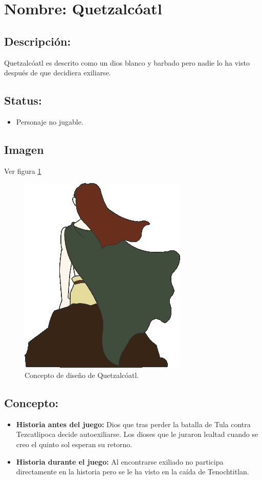 \section{Nombre: Quetzalcóatl}  \label{per:quetzalcoatl}
\subsection{Descripción:}
Quetzalcóatl es descrito como un dios blanco y barbado pero nadie lo ha visto después de que decidiera exiliarse.
\subsection{Status:}
\begin{itemize}
		\item Personaje no jugable.
	\end{itemize}
\subsection{Imagen}
Ver figura \ref{fig:quetDiseno}
	\begin{figure}
					\centering
					\includegraphics[height=0.3 \textheight]{Imagenes/quet}
					\caption{Concepto de diseño de Quetzalcóatl.}
					\label{fig:quetDiseno}
	\end{figure}
\subsection{Concepto:}
\begin{itemize}
	\item \textbf{Historia antes del juego:}
	Dios que tras perder la batalla de Tula contra Tezcatlipoca decide autoexiliarse. Los dioses que le juraron lealtad cuando se creo el quinto sol esperan su retorno.
	\item \textbf{Historia durante el juego:}
	Al encontrarse exiliado no participa directamente en la historia pero se le ha visto en la caída de Tenochtitlan.
\end{itemize} 
